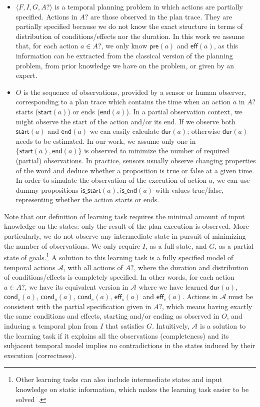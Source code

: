 \documentclass[10pt,journal,compsoc]{IEEEtran}
\newcommand{\tup}[1]{{\langle #1 \rangle}}
\newcommand{\pre}{\mathsf{pre}}    %
\newcommand{\eff}{\mathsf{eff}}    %
\newcommand{\cond}{\mathsf{cond}}  %
\newcommand{\dur}{\mathsf{dur}}    %
\newcommand{\start}{\mathsf{start}}%
\newcommand{\en}{\mathsf{end}}     %
\begin{document}
\begin{itemize}
	
	\item $\tup{F,I,G,A?}$ is a temporal planning problem in which actions are partially specified. Actions in $A?$ are those observed in the plan trace. They are partially specified because we do not know the exact structure in terms of distribution of conditions/effects nor the duration. In this work we assume that, for each action $a \in A?$, we only know $\pre(a)$ and $\eff(a)$, as this information can be extracted from the classical version of the planning problem, from prior knowledge we have on the problem, or given by an expert.
	
	\item $O$ is the sequence of observations, provided by a sensor or human observer, corresponding to a plan trace which contains the time when an action $a$ in $A?$ starts ($\start(a)$) or ends ($\en(a)$). In a partial observation context, we might observe the start of the action and/or its end. If we observe both $\start(a)$ and $\en(a)$ we can easily calculate $\dur(a)$; otherwise $\dur(a)$ needs to be estimated. In our work, we assume only one in $\{\start(a), \en(a)\}$ is observed to minimize the number of required (partial) observations. In practice, sensors usually observe changing properties of the word and deduce whether a proposition is true or false at a given time. In order to simulate the observation of the execution of action $a$, we can use dummy propositions $\mathsf{is\_start}(a), \mathsf{is\_end}(a)$ with values true/false, representing whether the action starts or ends.%
			
\end{itemize}


Note that our definition of learning task requires the minimal amount of input knowledge on the states: only the result of the plan execution is observed. 
More particularly, we do not observe any intermediate state in pursuit of minimizing the number of observations. We only require $I$, as a full state, and $G$, as a partial state of goals.\footnote{Other learning tasks can also include intermediate states and input knowledge on static information, which makes the learning task easier to be solved~\cite{aineto2018icaps}.} A solution to this learning task is a fully specified model of temporal actions $\mathcal{A}$, with all actions of $A?$, where the duration and distribution of conditions/effects is completely specified. In other words, for each action $a \in A?$, we have its equivalent version in $\mathcal{A}$ where we have learned $\dur(a)$, $\cond_s(a)$, $\cond_o(a)$, $\cond_e(a)$, $\eff_s(a)$ and $\eff_e(a)$.
Actions in $\mathcal{A}$ must be consistent with the partial specification given in $A?$, which means having exactly the same conditions and effects, starting and/or ending as observed in $O$, and inducing a temporal plan from $I$ that satisfies $G$. Intuitively, $\mathcal{A}$ is a solution to the learning task if it explains all the observations (completeness) and its subjacent temporal model implies no contradictions in the states induced by their execution (correctness).
\end{document}

